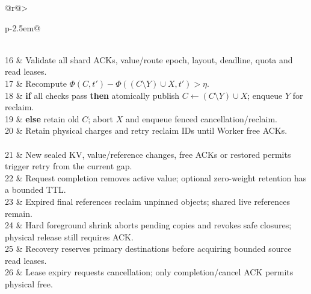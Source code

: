 \begin{algorithm*}[tp]
\begin{minipage}[t]{.48\textwidth}
\begin{tabular}[t]{@{}r@{\hspace{0.5em}}>{\raggedright\arraybackslash}p{\dimexpr\linewidth-2.5em\relax}@{}}
\end{tabular}\end{minipage}\hfill
\begin{minipage}[t]{.48\textwidth}\vspace{0pt}
\begin{tabular}[t]{@{}r@{\hspace{0.5em}}>{\raggedright\arraybackslash}p{\dimexpr\linewidth-2.5em\relax}@{}}
\\
16 & Validate all shard ACKs, value/route epoch, layout, deadline, quota and read leases.\\
17 & Recompute $\Phi(C,t')-\Phi((C\setminus Y)\cup X,t')>\eta$.\\
18 & \textbf{if} all checks pass \textbf{then} atomically publish $C\gets(C\setminus Y)\cup X$; enqueue $Y$ for reclaim.\\
19 & \textbf{else} retain old $C$; abort $X$ and enqueue fenced cancellation/reclaim.\\
20 & Retain physical charges and retry reclaim IDs until Worker free ACKs.\\
\\
21 & New sealed KV, value/reference changes, free ACKs or restored permits trigger retry from the current gap.\\
22 & Request completion removes active value; optional zero-weight retention has a bounded TTL.\\
23 & Expired final references reclaim unpinned objects; shared live references remain.\\
24 & Hard foreground shrink aborts pending copies and revokes safe closures; physical release still requires ACK.\\
25 & Recovery reserves primary destinations before acquiring bounded source read leases.\\
26 & Lease expiry requests cancellation; only completion/cancel ACK permits physical free.\\
\end{tabular}\end{minipage}
\end{algorithm*}
